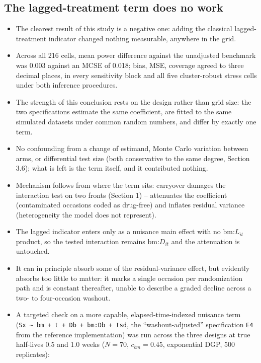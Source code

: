 \documentclass[
  11pt,
]{article}
\providecommand{\tightlist}{%
  \setlength{\itemsep}{0pt}\setlength{\parskip}{0pt}}
\begin{document}
\subsection{The lagged-treatment term does no work}\label{the-lagged-treatment-term-does-no-work}

\begin{itemize}
\tightlist
\item
  The clearest result of this study is a negative one: adding the
  classical lagged-treatment indicator changed nothing measurable,
  anywhere in the grid.
\item
  Across all 216 cells, mean power difference against the unadjusted
  benchmark was 0.003 against an MCSE of 0.018; bias, MSE, coverage
  agreed to three decimal places, in every sensitivity block and all
  five cluster-robust stress cells under both inference procedures.
\item
  The strength of this conclusion rests on the design rather than
  grid size: the two specifications estimate the same coefficient,
  are fitted to the same simulated datasets under common random
  numbers, and differ by exactly one term.
\item
  No confounding from a change of estimand, Monte Carlo variation
  between arms, or differential test size (both conservative to the
  same degree, Section 3.6); what is left is the term itself, and it
  contributed nothing.
\item
  Mechanism follows from where the term sits: carryover damages the
  interaction test on two fronts (Section 1) -- attenuates the
  coefficient (contaminated occasions coded as drug-free) and
  inflates residual variance (heterogeneity the model does not
  represent).
\item
  The lagged indicator enters only as a nuisance main effect with no
  \(\text{bm:}L_{it}\) product, so the tested interaction remains
  \(\text{bm:}D_{it}\) and the attenuation is untouched.
\item
  It can in principle absorb some of the residual-variance effect,
  but evidently absorbs too little to matter: it marks a single
  occasion per randomization path and is constant thereafter, unable
  to describe a graded decline across a two- to four-occasion
  washout.
\item
  A targeted check on a more capable, elapsed-time-indexed nuisance
  term (\texttt{Sx\ \textasciitilde{}\ bm\ +\ t\ +\ Db\ +\ bm:Db\ +\ tsd}, the ``washout-adjusted''
  specification \texttt{E4} from the reference implementation) was run
  across the three designs at true half-lives 0.5 and 1.0 weeks
  (\(N=70\), \(c_{bm}=0.45\), exponential DGP, 500 replicates):


\end{itemize}
\end{document}
